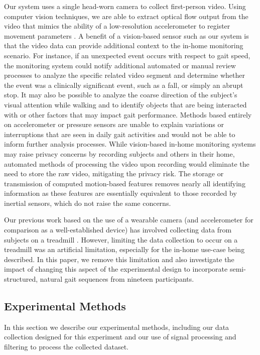 \documentclass[12pt]{report}
\begin{document}
Our system uses a single head-worn camera to collect first-person video. Using computer vision techniques, we are able to extract optical flow output from the video that mimics the ability of a low-resolution accelerometer to register movement parameters \cite{Schneider2017PreliminaryProcessing}. A benefit of a vision-based sensor such as our system is that the video data can provide additional context to the in-home monitoring scenario. For instance, if an unexpected event occurs with respect to gait speed, the monitoring system could notify additional automated or manual review processes to analyze the specific related video segment and determine whether the event was a clinically significant event, such as a fall, or simply an abrupt stop. It may also be possible to analyze the coarse direction of the subject's visual attention while walking and to identify objects that are being interacted with or other factors that may impact gait performance. Methods based entirely on accelerometer or pressure sensors are unable to explain variations or interruptions that are seen in daily gait activities and would not be able to inform further analysis processes. While vision-based in-home monitoring systems may raise privacy concerns by recording subjects and others in their home, automated methods of processing the video upon recording would eliminate the need to store the raw video, mitigating the privacy risk. The storage or transmission of computed motion-based features removes nearly all identifying information as these features are essentially equivalent to those recorded by inertial sensors, which do not raise the same concerns.

Our previous work based on the use of a wearable camera (and accelerometer for comparison as a well-established device) has involved collecting data from subjects on a treadmill \cite{Schneider2017}. However, limiting the data collection to occur on a treadmill was an artificial limitation, especially for the in-home use-case being described. In this paper, we remove this limitation and also investigate the impact of changing this aspect of the experimental design to incorporate semi-structured, natural gait sequences from nineteen participants.

\subsection{Experimental Methods}
In this section we describe our experimental methods, including our data collection designed for this experiment and our use of signal processing and filtering to process the collected dataset.
\end{document}
